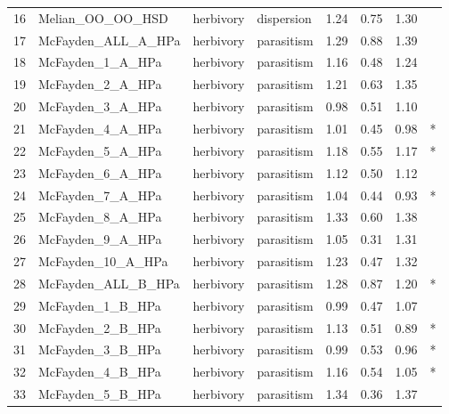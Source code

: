 \begin{tabular}{llllrrrl}
16 &    Melian\_OO\_OO\_HSD &    herbivory &   dispersion &   1.24 &    0.75 &    1.30 &                 \\
17 &  McFayden\_ALL\_A\_HPa &    herbivory &   parasitism &   1.29 &    0.88 &    1.39 &                 \\
18 &    McFayden\_1\_A\_HPa &    herbivory &   parasitism &   1.16 &    0.48 &    1.24 &                 \\
19 &    McFayden\_2\_A\_HPa &    herbivory &   parasitism &   1.21 &    0.63 &    1.35 &                 \\
20 &    McFayden\_3\_A\_HPa &    herbivory &   parasitism &   0.98 &    0.51 &    1.10 &                 \\
21 &    McFayden\_4\_A\_HPa &    herbivory &   parasitism &   1.01 &    0.45 &    0.98 &               * \\
22 &    McFayden\_5\_A\_HPa &    herbivory &   parasitism &   1.18 &    0.55 &    1.17 &               * \\
23 &    McFayden\_6\_A\_HPa &    herbivory &   parasitism &   1.12 &    0.50 &    1.12 &                 \\
24 &    McFayden\_7\_A\_HPa &    herbivory &   parasitism &   1.04 &    0.44 &    0.93 &               * \\
25 &    McFayden\_8\_A\_HPa &    herbivory &   parasitism &   1.33 &    0.60 &    1.38 &                 \\
26 &    McFayden\_9\_A\_HPa &    herbivory &   parasitism &   1.05 &    0.31 &    1.31 &                 \\
27 &   McFayden\_10\_A\_HPa &    herbivory &   parasitism &   1.23 &    0.47 &    1.32 &                 \\
28 &  McFayden\_ALL\_B\_HPa &    herbivory &   parasitism &   1.28 &    0.87 &    1.20 &               * \\
29 &    McFayden\_1\_B\_HPa &    herbivory &   parasitism &   0.99 &    0.47 &    1.07 &                 \\
30 &    McFayden\_2\_B\_HPa &    herbivory &   parasitism &   1.13 &    0.51 &    0.89 &               * \\
31 &    McFayden\_3\_B\_HPa &    herbivory &   parasitism &   0.99 &    0.53 &    0.96 &               * \\
32 &    McFayden\_4\_B\_HPa &    herbivory &   parasitism &   1.16 &    0.54 &    1.05 &               * \\
33 &    McFayden\_5\_B\_HPa &    herbivory &   parasitism &   1.34 &    0.36 &    1.37 &                 \\

\end{tabular}
